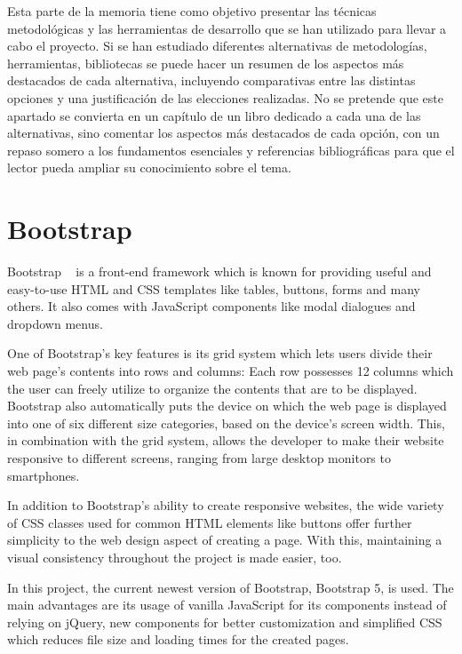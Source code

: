 
Esta parte de la memoria tiene como objetivo presentar las técnicas metodológicas y las herramientas de desarrollo que se han utilizado para llevar a cabo el proyecto. Si se han estudiado diferentes alternativas de metodologías, herramientas, bibliotecas se puede hacer un resumen de los aspectos más destacados de cada alternativa, incluyendo comparativas entre las distintas opciones y una justificación de las elecciones realizadas. 
No se pretende que este apartado se convierta en un capítulo de un libro dedicado a cada una de las alternativas, sino comentar los aspectos más destacados de cada opción, con un repaso somero a los fundamentos esenciales y referencias bibliográficas para que el lector pueda ampliar su conocimiento sobre el tema.

\section{Bootstrap}
Bootstrap ~\cite{bootstrap5_tutorial} is a front-end framework which is known for providing useful and easy-to-use HTML and CSS templates like tables, buttons, forms and many others. It also comes with JavaScript components like modal dialogues and dropdown menus.

One of Bootstrap's key features is its grid system which lets users divide their web page's contents into rows and columns:
Each row possesses 12 columns which the user can freely utilize to organize the contents that are to be displayed. Bootstrap also automatically puts the device on which the web page is displayed into one of six different size categories, based on the device's screen width. This, in combination with the grid system, allows the developer to make their website responsive to different screens, ranging from large desktop monitors to smartphones.

In addition to Bootstrap's ability to create responsive websites, the wide variety of CSS classes used for common HTML elements like buttons offer further simplicity to the web design aspect of creating a page. With this, maintaining a visual consistency throughout the project is made easier, too.

In this project, the current newest version of Bootstrap, Bootstrap 5, is used. The main advantages are its usage of vanilla JavaScript for its components instead of relying on jQuery, new components for better customization and simplified CSS which reduces file size and loading times for the created pages.
